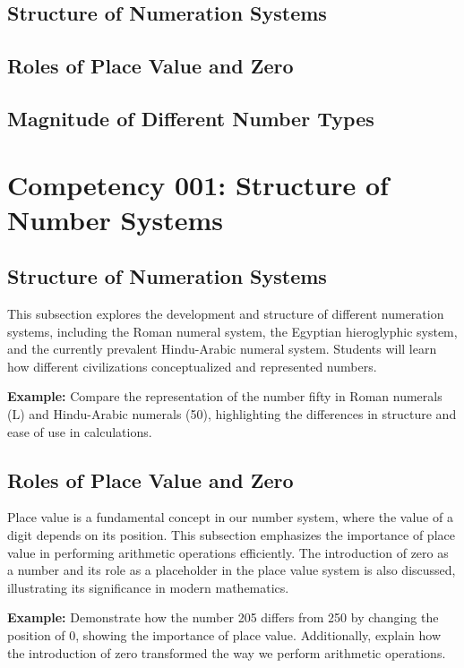 \documentclass{book}
\begin{document}
\subsection{Structure of Numeration Systems}
\subsection{Roles of Place Value and Zero}
\subsection{Magnitude of Different Number Types}
\section{Competency 001: Structure of Number Systems}
\subsection{Structure of Numeration Systems}
This subsection explores the development and structure of different numeration systems, including the Roman numeral system, the Egyptian hieroglyphic system, and the currently prevalent Hindu-Arabic numeral system. Students will learn how different civilizations conceptualized and represented numbers.


\textbf{Example:} Compare the representation of the number fifty in Roman numerals (L) and Hindu-Arabic numerals (50), highlighting the differences in structure and ease of use in calculations.


\subsection{Roles of Place Value and Zero}
Place value is a fundamental concept in our number system, where the value of a digit depends on its position. This subsection emphasizes the importance of place value in performing arithmetic operations efficiently. The introduction of zero as a number and its role as a placeholder in the place value system is also discussed, illustrating its significance in modern mathematics.


\textbf{Example:} Demonstrate how the number 205 differs from 250 by changing the position of 0, showing the importance of place value. Additionally, explain how the introduction of zero transformed the way we perform arithmetic operations.
\end{document}
